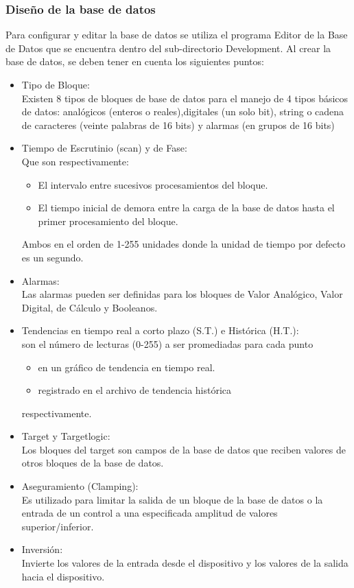 \subsubsection{Diseño de la base de datos}
Para configurar y editar la base de datos se utiliza el programa 
Editor de la Base de Datos que se encuentra dentro del sub-directorio 
Development. Al crear la base de datos, se deben tener en cuenta los 
siguientes puntos:
\begin{itemize}
  \item Tipo de Bloque:\\Existen 8 tipos de bloques de base de datos para el
    manejo de 4 tipos básicos de datos: analógicos (enteros o reales),digitales 
    (un solo bit), string o cadena de caracteres (veinte palabras de 16 bits) y
    alarmas (en grupos de 16 bits)
  \item Tiempo de Escrutinio (scan) y de Fase:\\Que son respectivamente:
    \begin{itemize}
      \item El intervalo entre sucesivos procesamientos del bloque.
      \item El tiempo inicial de demora entre la carga de la base de datos 
      hasta el primer procesamiento del bloque.
    \end{itemize}
    Ambos en el orden de 1-255 unidades donde la unidad de tiempo por defecto es 
    un segundo.
  \item Alarmas:\\Las alarmas pueden ser definidas para los bloques de Valor 
    Analógico, Valor Digital, de Cálculo y Booleanos.
  \item Tendencias en tiempo real a corto plazo (S.T.) e Histórica (H.T.):\\son 
    el número de lecturas (0-255) a ser promediadas para cada punto 
    \begin{itemize}
      \item en un gráfico de tendencia en tiempo real.
      \item registrado en el archivo de tendencia histórica
    \end{itemize}
    respectivamente.
  \item Target y Targetlogic:\\Los bloques del target son campos de la base de 
    datos que reciben valores de otros bloques de la base de datos.
  \item Aseguramiento (Clamping):\\Es utilizado para limitar la salida de un 
    bloque de la base de datos o la entrada de un control a una especificada 
    amplitud de valores superior/inferior.
  \item Inversión:\\ Invierte los valores de la entrada desde el dispositivo y 
    los valores de la salida hacia el dispositivo.
\end{itemize}

